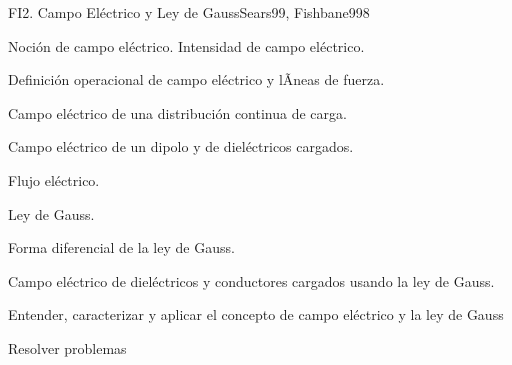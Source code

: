 \begin{syllabus}
\begin{unit}{FI2. Campo Eléctrico y Ley de Gauss}{Sears99, Fishbane99}{8}
   \begin{topics}
         \item  Noción de campo eléctrico.  Intensidad de campo eléctrico.
	 \item  Definición operacional de campo eléctrico y lÃ­neas de fuerza.
         \item  Campo eléctrico de una distribución continua de carga.
	 \item  Campo eléctrico de un dipolo y de dieléctricos cargados.
         \item  Flujo eléctrico.
	 \item  Ley de Gauss.
         \item  Forma diferencial de la ley de Gauss.
	 \item  Campo eléctrico de dieléctricos y conductores cargados usando la ley de Gauss.
   \end{topics}

   \begin{unitgoals}
         \item  Entender, caracterizar y aplicar el concepto de campo eléctrico y la ley de Gauss
         \item  Resolver problemas
   \end{unitgoals}
\end{unit}


\end{syllabus}
